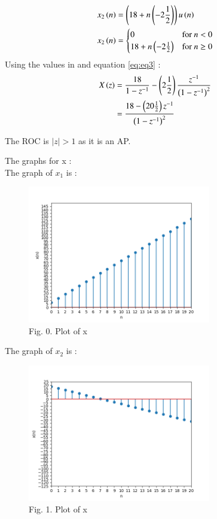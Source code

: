 \documentclass[journal,12pt,twocolumn]{IEEEtran}
\theoremstyle{remark}
\begin{document}
\textbf{}

\begin{align}
x_{2}\left(n\right) &= \left(18 + n\left(-2\frac{1}{2}\right)\right)u\left(n\right)\\
     x_{2}\left(n\right) & = \begin{cases}
        0 & \text{for } n < 0 \\
        18 + n\left(-2\frac{1}{2}\right) & \text{for } n \geq 0
    \end{cases}
 \end{align}
Using the values in  and equation \eqref{eq:eq3} :
\begin{align} 
 X\left(z\right) &=  \frac{18}{1 - z^{-1}} - \left(2\frac{1}{2}\right)\frac{z^{-1}}{\left(1-z^{-1}\right)^2}\\
&= \frac{18 - \left(20\frac{1}{2}\right)z^{-1}}{\left(1 - z^{-1}\right)^2}
\end{align}

The ROC is $|z|>1$ as it is an AP.

\newpage
The graphs for x : \\
\large\textbf{} \normalsize The graph of $x_{1}$ is :
\begin{figure}[ht]
    \begin{center}
    \includegraphics[width = 8cm]{Figure_1}\\
    Fig. 0. Plot of x \\
    \end{center}
\end{figure}

\large\textbf{} \normalsize The graph of $x_{2}$ is :
\begin{figure}[!ht]
    \begin{center}
    \includegraphics[width = 8cm]{Figure_2}\\
    Fig. 1. Plot of x \\
    \end{center}
\end{figure}
\end{document}
